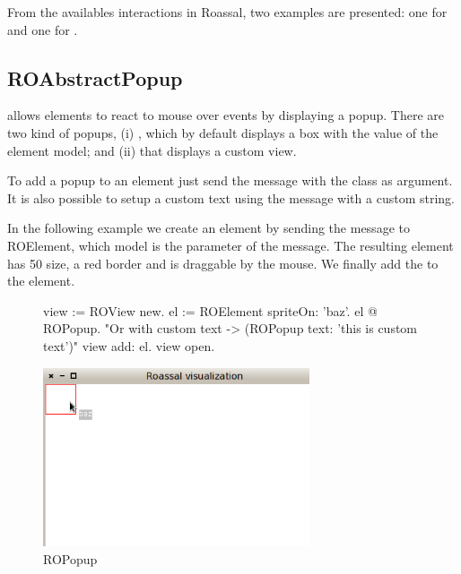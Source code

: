 \documentclass[a4paper,10pt,twoside]{book}
\begin{document}
From the availables interactions in Roassal, two examples are presented: one for  and one for .

\subsection*{ROAbstractPopup}

 allows elements to react to mouse over events by displaying a popup. There are two kind of popups, (i) , which by default displays a box with the  value of the element model; and (ii)  that displays a custom view.

To add a popup to an element just send the  message with the  class as argument. It is also possible to setup a custom text using the  message with a custom string. 

In the following example we create an element by sending the  message to ROElement, which model is the parameter of the message. The resulting element has 50 size, a red border and is draggable by the mouse. We finally add the  to the element.


\begin{figure}[H]
      \begin{minipage}[t]{1\textwidth}
      \vspace{0pt}
     \begin{code}{}
view := ROView new.
el := ROElement spriteOn: 'baz'.
el @ ROPopup. "Or with custom text -> (ROPopup text: 'this is custom text')"
view add: el.
view open.
  \end{code}
   \end{minipage}
   \hfill
   \begin{minipage}[t]{1\textwidth}
	 \vspace{0pt} \raggedright
       \centering
		\includegraphics[width=0.7\textwidth]{popup}
   \end{minipage}
\label{fig:popup}
\caption{ROPopup}
\end{figure} 
\end{document}
